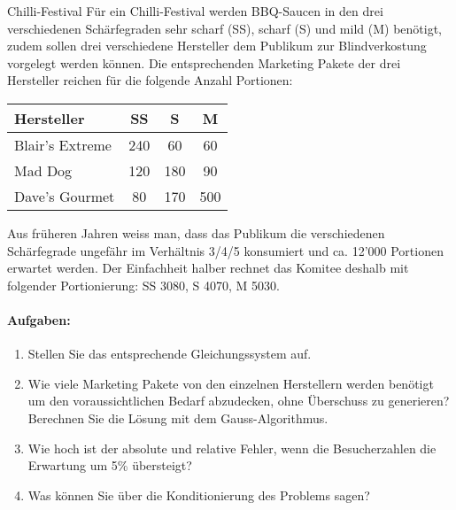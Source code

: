 \begin{example2}{Chilli-Festival}
Für ein Chilli-Festival werden BBQ-Saucen in den drei verschiedenen Schärfegraden sehr scharf (SS), scharf (S) und mild (M) benötigt, zudem sollen drei verschiedene Hersteller dem Publikum zur Blindverkostung vorgelegt werden können. Die entsprechenden Marketing Pakete der drei Hersteller reichen für die folgende Anzahl Portionen:

\begin{center}
\begin{tabular}{l|ccc}
Hersteller & SS & S & M \\\hline
Blair's Extreme & 240 & 60 & 60\\
Mad Dog & 120 & 180 & 90\\
Dave's Gourmet & 80 & 170 & 500
\end{tabular}
\end{center}

Aus früheren Jahren weiss man, dass das Publikum die verschiedenen Schärfegrade ungefähr im Verhältnis 3/4/5 konsumiert und ca. 12'000 Portionen erwartet werden. Der Einfachheit halber rechnet das Komitee deshalb mit folgender Portionierung: SS 3080, S 4070, M 5030.

\paragraph{Aufgaben:}
\begin{enumerate}
    \item Stellen Sie das entsprechende Gleichungssystem auf.
    \item Wie viele Marketing Pakete von den einzelnen Herstellern werden benötigt um den voraussichtlichen Bedarf abzudecken, ohne Überschuss zu generieren? Berechnen Sie die Lösung mit dem Gauss-Algorithmus.
    \item Wie hoch ist der absolute und relative Fehler, wenn die Besucherzahlen die Erwartung um 5\% übersteigt?
    \item Was können Sie über die Konditionierung des Problems sagen?
\end{enumerate}
\end{example2}

